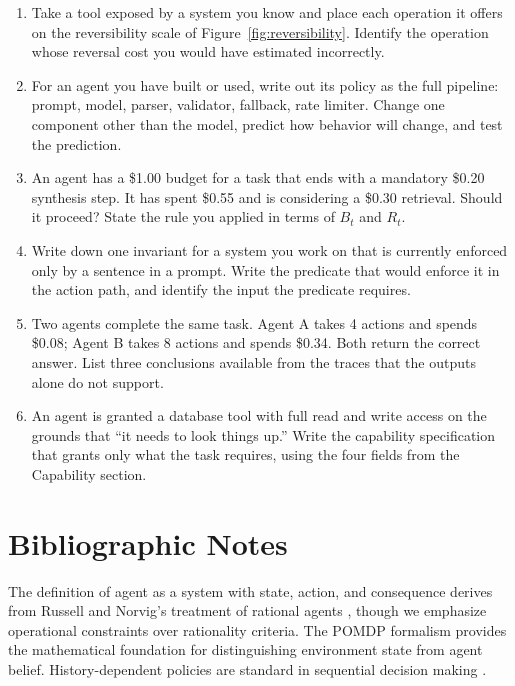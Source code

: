 \documentclass[11pt]{book}
\begin{document}
\begin{enumerate}
\item Take a tool exposed by a system you know and place each operation it offers on the reversibility scale of Figure~\ref{fig:reversibility}. Identify the operation whose reversal cost you would have estimated incorrectly.

\item For an agent you have built or used, write out its policy as the full pipeline: prompt, model, parser, validator, fallback, rate limiter. Change one component other than the model, predict how behavior will change, and test the prediction.

\item An agent has a \$1.00 budget for a task that ends with a mandatory \$0.20 synthesis step. It has spent \$0.55 and is considering a \$0.30 retrieval. Should it proceed? State the rule you applied in terms of $B_t$ and $R_t$.

\item Write down one invariant for a system you work on that is currently enforced only by a sentence in a prompt. Write the predicate that would enforce it in the action path, and identify the input the predicate requires.

\item Two agents complete the same task. Agent A takes 4 actions and spends \$0.08; Agent B takes 8 actions and spends \$0.34. Both return the correct answer. List three conclusions available from the traces that the outputs alone do not support.

\item An agent is granted a database tool with full read and write access on the grounds that ``it needs to look things up.'' Write the capability specification that grants only what the task requires, using the four fields from the Capability section.
\end{enumerate}

\section*{Bibliographic Notes}

The definition of agent as a system with state, action, and consequence derives from Russell and Norvig's treatment of rational agents \cite{russell2010artificial}, though we emphasize operational constraints over rationality criteria. The POMDP formalism \cite{kaelbling1998planning} provides the mathematical foundation for distinguishing environment state from agent belief. History-dependent policies are standard in sequential decision making \cite{puterman1994markov}.
\end{document}
